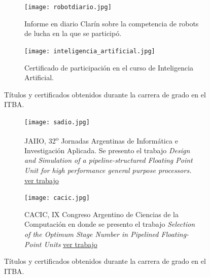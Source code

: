    \begin{figure}
      \begin{center}
      \ContinuedFloat
         \begin{subfigure}[b]{0.40\textwidth}
            \begin{center}
               \texttt{[image: robotdiario.jpg]}
               \caption{Informe en diario Clarín sobre la competencia de robots de lucha en la que se participó.}
               \label{fig:robotdiario}
            \end{center}
         \end{subfigure}%
         \hfill
         \begin{subfigure}[b]{0.55\textwidth}
            \texttt{[image: inteligencia\_artificial.jpg]}
            \caption{Certificado de participación en el curso de Inteligencia Artificial.}
            \label{fig:foto_ai}
         \end{subfigure}%
      \caption{Títulos y certificados obtenidos durante la carrera de grado en el ITBA.}
      \label{fig:titulos_del_itba}
      \end{center}
   \end{figure}








   \begin{figure}
      \begin{center}
      \ContinuedFloat
         \begin{subfigure}[b]{0.45\textwidth}
            \texttt{[image: sadio.jpg]}
            \caption{JAIIO, 32\textsuperscript{o} Jornadas Argentinas de Informática e Investigación Aplicada. Se presento el trabajo \emph{Design and Simulation of a pipeline-structured Floating Point Unit for high performance general purpose processors.} \href{https://drive.google.com/open?id=15NkqA_rWbaObx1uiqe7ruBg9lWpIh5q7}{ver trabajo}}
            \label{fig:jaiio}
         \end{subfigure}%
         \hfill
         \begin{subfigure}[b]{0.45\textwidth}
            \texttt{[image: cacic.jpg]}
            \caption{CACIC, IX Congreso Argentino de Ciencias de la Computación en donde se presento el trabajo \emph{Selection of the Optimum Stage Number in Pipelined Floating-Point Units} \href{https://drive.google.com/open?id=11z5qRrJ01Is6dx5NMHAOoXl3D0r2o8OY}{ver trabajo}}
            \label{fig:cacic}
         \end{subfigure}%
      \end{center}
      \caption{Títulos y certificados obtenidos durante la carrera de grado en el ITBA.}
      \label{fig:titulos_del_itba}
   \end{figure}




